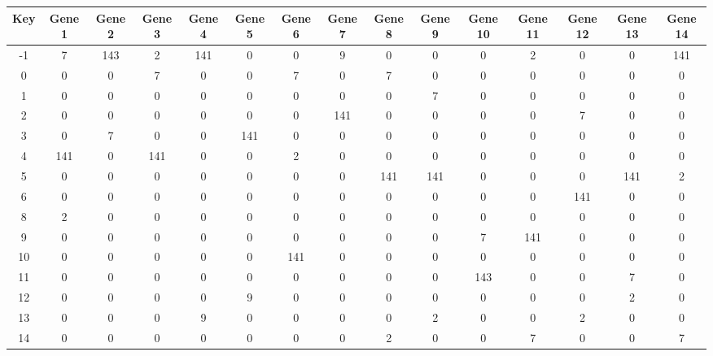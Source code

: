 \begin{tabular}{|c|c|c|c|c|c|c|c|c|c|c|c|c|c|c|}
\hline
Key & Gene 1 & Gene 2 & Gene 3 & Gene 4 & Gene 5 & Gene 6 & Gene 7 & Gene 8 & Gene 9 & Gene 10 & Gene 11 & Gene 12 & Gene 13 & Gene 14 \\
\hline
-1 & 7 & 143 & 2 & 141 & 0 & 0 & 9 & 0 & 0 & 0 & 2 & 0 & 0 & 141 \\
0 & 0 & 0 & 7 & 0 & 0 & 7 & 0 & 7 & 0 & 0 & 0 & 0 & 0 & 0 \\
1 & 0 & 0 & 0 & 0 & 0 & 0 & 0 & 0 & 7 & 0 & 0 & 0 & 0 & 0 \\
2 & 0 & 0 & 0 & 0 & 0 & 0 & 141 & 0 & 0 & 0 & 0 & 7 & 0 & 0 \\
3 & 0 & 7 & 0 & 0 & 141 & 0 & 0 & 0 & 0 & 0 & 0 & 0 & 0 & 0 \\
4 & 141 & 0 & 141 & 0 & 0 & 2 & 0 & 0 & 0 & 0 & 0 & 0 & 0 & 0 \\
5 & 0 & 0 & 0 & 0 & 0 & 0 & 0 & 141 & 141 & 0 & 0 & 0 & 141 & 2 \\
6 & 0 & 0 & 0 & 0 & 0 & 0 & 0 & 0 & 0 & 0 & 0 & 141 & 0 & 0 \\
8 & 2 & 0 & 0 & 0 & 0 & 0 & 0 & 0 & 0 & 0 & 0 & 0 & 0 & 0 \\
9 & 0 & 0 & 0 & 0 & 0 & 0 & 0 & 0 & 0 & 7 & 141 & 0 & 0 & 0 \\
10 & 0 & 0 & 0 & 0 & 0 & 141 & 0 & 0 & 0 & 0 & 0 & 0 & 0 & 0 \\
11 & 0 & 0 & 0 & 0 & 0 & 0 & 0 & 0 & 0 & 143 & 0 & 0 & 7 & 0 \\
12 & 0 & 0 & 0 & 0 & 9 & 0 & 0 & 0 & 0 & 0 & 0 & 0 & 2 & 0 \\
13 & 0 & 0 & 0 & 9 & 0 & 0 & 0 & 0 & 2 & 0 & 0 & 2 & 0 & 0 \\
14 & 0 & 0 & 0 & 0 & 0 & 0 & 0 & 2 & 0 & 0 & 7 & 0 & 0 & 7 \\
\hline
\end{tabular}
